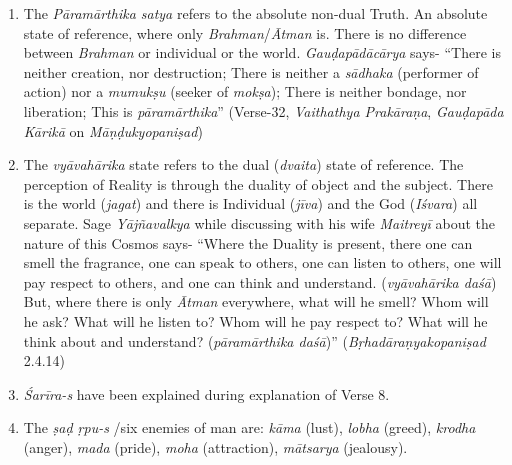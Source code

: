 \begin{enumerate}
\itemsep=0pt
\item
  The \emph{Pāramārthika satya} refers to the absolute non-dual Truth. An absolute state of reference, where only \emph{Brahman}/\emph{Ātman} is. There is no difference between \emph{Brahman} or individual or the world. \emph{Gauḍapādācārya} says- ``There is neither creation, nor destruction; There is neither a \emph{sādhaka} (performer of action) nor a \emph{mumukṣu} (seeker of \emph{mokṣa}); There is neither bondage, nor liberation; This is \emph{pāramārthika}'' (Verse-32, \emph{Vaithathya Prakāraṇa}, \emph{Gauḍapāda Kārikā} on \emph{Māṇḍukyopaniṣad})
\item
  The \emph{vyāvahārika} state refers to the dual (\emph{dvaita}) state of reference. The perception of Reality is through the duality of object and the subject. There is the world (\emph{jagat}) and there is Individual (\emph{jīva}) and the God (\emph{Iśvara}) all separate. Sage \emph{Yājñavalkya} while discussing with his wife \emph{Maitreyī} about the nature of this Cosmos says- ``Where the Duality is present, there one can smell the fragrance, one can speak to others, one can listen to others, one will pay respect to others, and one can think and understand. (\emph{vyāvahārika daśā}) But, where there is only \emph{Ātman} everywhere, what will he smell? Whom will he ask? What will he listen to? Whom will he pay respect to? What will he think about and understand? (\emph{pāramārthika daśā})'' (\emph{Bṛhadāraṇyakopaniṣad} 2.4.14)
\item
  \emph{Śarīra-s} have been explained during explanation of Verse 8.
\item
  The \emph{ṣaḍ ṛpu-s} /six enemies of man are: \emph{kāma} (lust), \emph{lobha} (greed), \emph{krodha} (anger), \emph{mada} (pride), \emph{moha} (attraction), \emph{mātsarya} (jealousy).
\end{enumerate}
